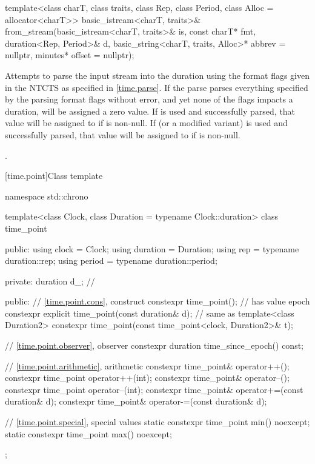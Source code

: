 %
\begin{itemdecl}
template<class charT, class traits, class Rep, class Period, class Alloc = allocator<charT>>
  basic_istream<charT, traits>&
    from_stream(basic_istream<charT, traits>& is, const charT* fmt,
                duration<Rep, Period>& d,
                basic_string<charT, traits, Alloc>* abbrev = nullptr,
                minutes* offset = nullptr);
\end{itemdecl}

\begin{itemdescr}
\pnum
\effects
Attempts to parse the input stream 
into the duration 
using the format flags given in the NTCTS 
as specified in \ref{time.parse}.
If the parse parses everything specified by the parsing format flags without error,
and yet none of the flags impacts a duration,
 will be assigned a zero value.
If  is used and successfully parsed,
that value will be assigned to  if  is non-null.
If  (or a modified variant) is used and successfully parsed,
that value will be assigned to  if  is non-null.

\pnum
\returns
{}.
\end{itemdescr}

[time.point]{Class template }

%
\begin{codeblock}
namespace std::chrono {
  template<class Clock, class Duration = typename Clock::duration>
  class time_point {
  public:
    using clock    = Clock;
    using duration = Duration;
    using rep      = typename duration::rep;
    using period   = typename duration::period;

  private:
    duration d_;                                                // \expos

  public:
    // \ref{time.point.cons}, construct
    constexpr time_point();                                     // has value epoch
    constexpr explicit time_point(const duration& d);           // same as 
    template<class Duration2>
      constexpr time_point(const time_point<clock, Duration2>& t);

    // \ref{time.point.observer}, observer
    constexpr duration time_since_epoch() const;

    // \ref{time.point.arithmetic}, arithmetic
    constexpr time_point& operator++();
    constexpr time_point operator++(int);
    constexpr time_point& operator--();
    constexpr time_point operator--(int);
    constexpr time_point& operator+=(const duration& d);
    constexpr time_point& operator-=(const duration& d);

    // \ref{time.point.special}, special values
    static constexpr time_point min() noexcept;
    static constexpr time_point max() noexcept;
  };
}
\end{codeblock}

